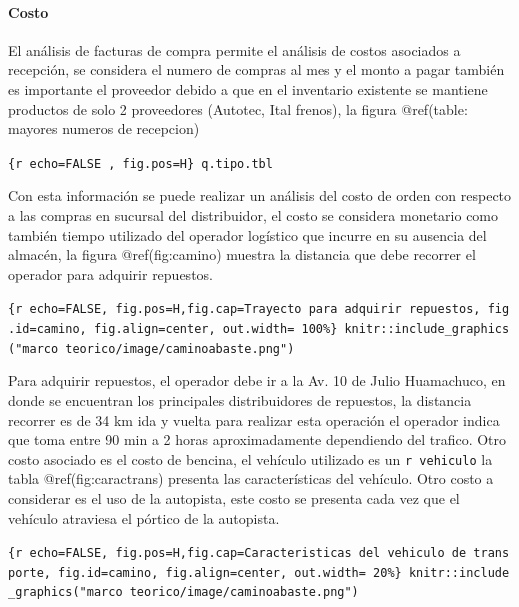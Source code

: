 \documentclass[11pt]{article}
\begin{document}
\hypertarget{costo}{%
\paragraph{Costo}\label{costo}}

El análisis de facturas de compra permite el análisis de costos
asociados a recepción, se considera el numero de compras al mes y el
monto a pagar también es importante el proveedor debido a que en el
inventario existente se mantiene productos de solo 2 proveedores
(Autotec, Ital frenos), la figura @ref(table: mayores numeros de
recepcion)

\texttt{\{r\ echo=FALSE\ ,\ fig.pos=\textquotesingle{}H\textquotesingle{}\}\ q.tipo.tbl}

Con esta información se puede realizar un análisis del costo de orden
con respecto a las compras en sucursal del distribuidor, el costo se
considera monetario como también tiempo utilizado del operador logístico
que incurre en su ausencia del almacén, la figura @ref(fig:camino)
muestra la distancia que debe recorrer el operador para adquirir
repuestos.

\texttt{\{r\ echo=FALSE,\ fig.pos=\textquotesingle{}H\textquotesingle{},fig.cap=\textquotesingle{}Trayecto\ para\ adquirir\ repuestos\textquotesingle{},\ fig.id=\textquotesingle{}camino\textquotesingle{},\ fig.align=\textquotesingle{}center\textquotesingle{},\ out.width=\ \textquotesingle{}100\%\textquotesingle{}\}\ knitr::include\_graphics("marco\ teorico/image/caminoabaste.png")}

Para adquirir repuestos, el operador debe ir a la Av. 10 de Julio
Huamachuco, en donde se encuentran los principales distribuidores de
repuestos, la distancia recorrer es de 34 km ida y vuelta para realizar
esta operación el operador indica que toma entre 90 min a 2 horas
aproximadamente dependiendo del trafico. Otro costo asociado es el costo
de bencina, el vehículo utilizado es un \texttt{r\ vehiculo} la tabla
@ref(fig:caractrans) presenta las características del vehículo. Otro
costo a considerar es el uso de la autopista, este costo se presenta
cada vez que el vehículo atraviesa el pórtico de la autopista.

\texttt{\{r\ echo=FALSE,\ fig.pos=\textquotesingle{}H\textquotesingle{},fig.cap=\textquotesingle{}Caracteristicas\ del\ vehiculo\ de\ transporte\textquotesingle{},\ fig.id=\textquotesingle{}camino\textquotesingle{},\ fig.align=\textquotesingle{}center\textquotesingle{},\ out.width=\ \textquotesingle{}20\%\textquotesingle{}\}\ knitr::include\_graphics("marco\ teorico/image/caminoabaste.png")}
\end{document}
